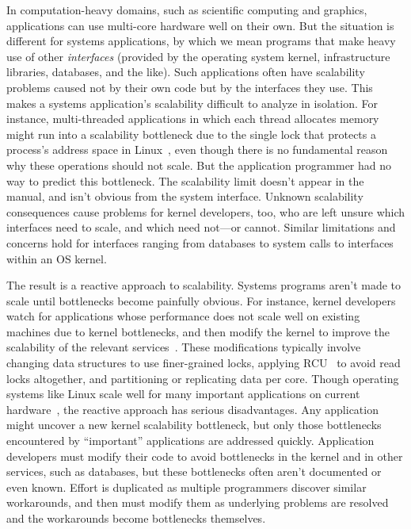 \label{sec:intro}

In computation-heavy domains, such as scientific computing and
graphics, applications can use multi-core hardware well on their own.
%
But the situation is different for systems applications, by which we
mean programs that make heavy use of other \emph{interfaces} (provided
by the operating system kernel, infrastructure libraries, databases, and
the like).
%
Such applications often have scalability problems caused not
by their own code but by the interfaces they use.
%
This makes a systems application's scalability difficult to analyze in
isolation.
%
For instance, multi-threaded applications
in which each thread allocates memory
might run into a scalability bottleneck due to the single lock that protects
a process's address space in Linux~\cite{clements:bonsai}, even though there
is no fundamental reason why these operations should not scale.
%
But the application programmer had no way to predict this bottleneck.
%
The scalability limit doesn't appear in the manual, and isn't obvious
from the system interface.
%
Unknown scalability consequences cause problems for kernel developers, too,
who are left unsure which interfaces need to scale, and which need
not---or cannot.
%
Similar limitations and concerns hold for interfaces ranging from
databases to system calls to interfaces within an OS kernel.

The result is a reactive approach to scalability.
%
Systems programs aren't made to scale until bottlenecks become
painfully obvious.
%
For instance, kernel developers watch for applications
whose performance does not scale well on existing machines due to kernel
bottlenecks, and then modify the kernel to improve the scalability of the
relevant services~\cite{cacm-real-world}.  These modifications typically
involve changing data structures to use finer-grained locks, applying
RCU~\cite{rcu:linux} to avoid read locks altogether, and partitioning or
replicating data per core.
%
Though operating systems like Linux scale well for many important applications on current
hardware~\cite{boyd-wickizer:scaling},
%
the reactive approach has serious disadvantages.
%
Any application might uncover a new kernel scalability bottleneck,
but only those bottlenecks encountered by ``important'' applications
are addressed quickly.
%
Application developers must modify their code to avoid bottlenecks in
the kernel and in other services, such as databases, but these
bottlenecks often aren't documented or even known.
%
Effort is duplicated as multiple programmers discover similar
workarounds, and then must modify them as underlying problems are
resolved and the workarounds become bottlenecks themselves.

